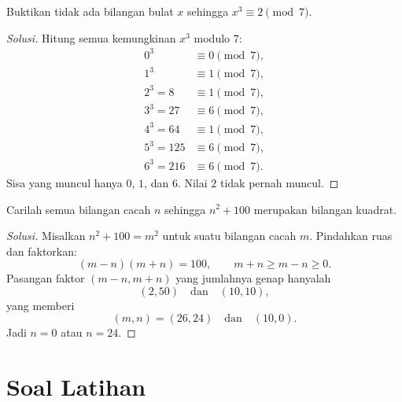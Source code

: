 \documentclass[12pt]{scrartcl}
\begin{document}
\begin{example}
Buktikan tidak ada bilangan bulat $x$ sehingga $x^3 \equiv 2 \pmod{7}$.
\end{example}
\begin{proof}[Solusi]
Hitung semua kemungkinan $x^3$ modulo $7$:
\begin{align*}
0^3 &\equiv 0 \pmod{7}, \\
1^3 &\equiv 1 \pmod{7}, \\
2^3 = 8 &\equiv 1 \pmod{7}, \\
3^3 = 27 &\equiv 6 \pmod{7}, \\
4^3 = 64 &\equiv 1 \pmod{7}, \\
5^3 = 125 &\equiv 6 \pmod{7}, \\
6^3 = 216 &\equiv 6 \pmod{7}.
\end{align*}
Sisa yang muncul hanya $0$, $1$, dan $6$.
Nilai $2$ tidak pernah muncul.
\end{proof}

\begin{example}
Carilah semua bilangan cacah $n$ sehingga $n^2 + 100$ merupakan bilangan kuadrat.
\end{example}
\begin{proof}[Solusi]
Misalkan $n^2 + 100 = m^2$ untuk suatu bilangan cacah $m$.
Pindahkan ruas dan faktorkan:
\[ (m - n)(m + n) = 100, \qquad m + n \ge m - n \ge 0. \]
Pasangan faktor $(m-n, m+n)$ yang jumlahnya genap hanyalah
\[ (2, 50) \quad \text{dan} \quad (10, 10), \]
yang memberi
\[ (m, n) = (26, 24) \quad \text{dan} \quad (10, 0). \]
Jadi $n = 0$ atau $n = 24$.
\end{proof}

\part*{Soal Latihan}
\end{document}
